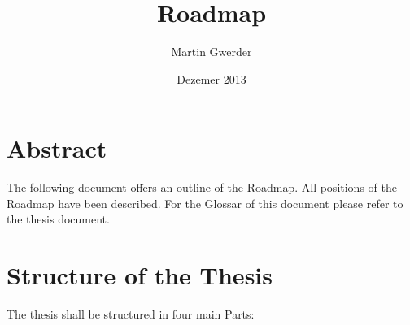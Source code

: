 \documentclass[11pt,a4paper]{article}
\begin{document}
\title{Roadmap}
\author{Martin Gwerder}
\date{Dezemer 2013}
\maketitle

\section{Abstract}
The following document offers an outline of the Roadmap. All positions of the Roadmap have been described. For the Glossar of this document please refer to the thesis document.

\section{Structure of the Thesis}
The thesis shall be structured in four main Parts:
\end{document}
